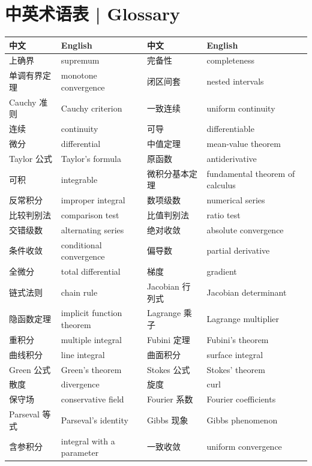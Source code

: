 \documentclass[UTF8,11pt,a4paper]{ctexart}
\begin{document}
\section*{中英术语表 | Glossary}
\begingroup\small
\setlength{\tabcolsep}{4pt}
\renewcommand{\arraystretch}{1.12}
\begin{tabular}{p{2.9cm}p{4.4cm}p{2.9cm}p{4.4cm}}
\hline
\textbf{中文} & \textbf{English} & \textbf{中文} & \textbf{English}\\
\hline
上确界 & supremum & 完备性 & completeness\\
单调有界定理 & monotone convergence & 闭区间套 & nested intervals\\
Cauchy 准则 & Cauchy criterion & 一致连续 & uniform continuity\\
连续 & continuity & 可导 & differentiable\\
微分 & differential & 中值定理 & mean-value theorem\\
Taylor 公式 & Taylor's formula & 原函数 & antiderivative\\
可积 & integrable & 微积分基本定理 & fundamental theorem of calculus\\
反常积分 & improper integral & 数项级数 & numerical series\\
比较判别法 & comparison test & 比值判别法 & ratio test\\
交错级数 & alternating series & 绝对收敛 & absolute convergence\\
条件收敛 & conditional convergence & 偏导数 & partial derivative\\
全微分 & total differential & 梯度 & gradient\\
链式法则 & chain rule & Jacobian 行列式 & Jacobian determinant\\
隐函数定理 & implicit function theorem & Lagrange 乘子 & Lagrange multiplier\\
重积分 & multiple integral & Fubini 定理 & Fubini's theorem\\
曲线积分 & line integral & 曲面积分 & surface integral\\
Green 公式 & Green's theorem & Stokes 公式 & Stokes' theorem\\
散度 & divergence & 旋度 & curl\\
保守场 & conservative field & Fourier 系数 & Fourier coefficients\\
Parseval 等式 & Parseval's identity & Gibbs 现象 & Gibbs phenomenon\\
含参积分 & integral with a parameter & 一致收敛 & uniform convergence\\
\hline
\end{tabular}
\endgroup
\end{document}
